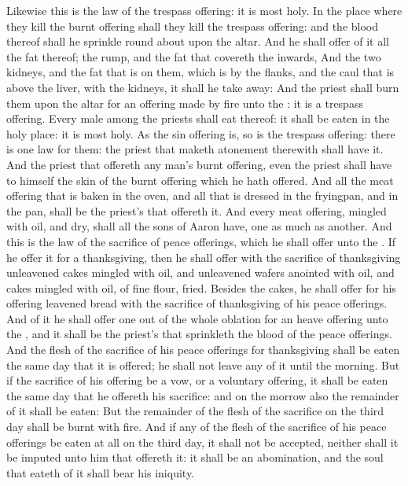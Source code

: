 \begin{biblechapter} %
 Likewise this is the law of the trespass offering: it is most holy.
\verse In the place where they kill the burnt offering shall they kill the trespass offering: and the blood thereof shall he sprinkle round about upon the altar.
\verse And he shall offer of it all the fat thereof; the rump, and the fat that covereth the inwards,
\verse And the two kidneys, and the fat that is on them, which is by the flanks, and the caul that is above the liver, with the kidneys, it shall he take away:
\verse And the priest shall burn them upon the altar for an offering made by fire unto the \LORD: it is a trespass offering.
\verse Every male among the priests shall eat thereof: it shall be eaten in the holy place: it is most holy.
\verse As the sin offering is, so is the trespass offering: there is one law for them: the priest that maketh atonement therewith shall have it.
\verse And the priest that offereth any man's burnt offering, even the priest shall have to himself the skin of the burnt offering which he hath offered.
\verse And all the meat offering that is baken in the oven, and all that is dressed in the fryingpan, and in the pan, shall be the priest's that offereth it.
\verse And every meat offering, mingled with oil, and dry, shall all the sons of Aaron have, one as much as another.
 And this is the law of the sacrifice of peace offerings, which he shall offer unto the \LORD.
\verse If he offer it for a thanksgiving, then he shall offer with the sacrifice of thanksgiving unleavened cakes mingled with oil, and unleavened wafers anointed with oil, and cakes mingled with oil, of fine flour, fried.
\verse Besides the cakes, he shall offer for his offering leavened bread with the sacrifice of thanksgiving of his peace offerings.
\verse And of it he shall offer one out of the whole oblation for an heave offering unto the \LORD, and it shall be the priest's that sprinkleth the blood of the peace offerings.
\verse And the flesh of the sacrifice of his peace offerings for thanksgiving shall be eaten the same day that it is offered; he shall not leave any of it until the morning.
\verse But if the sacrifice of his offering be a vow, or a voluntary offering, it shall be eaten the same day that he offereth his sacrifice: and on the morrow also the remainder of it shall be eaten:
\verse But the remainder of the flesh of the sacrifice on the third day shall be burnt with fire.
\verse And if any of the flesh of the sacrifice of his peace offerings be eaten at all on the third day, it shall not be accepted, neither shall it be imputed unto him that offereth it: it shall be an abomination, and the soul that eateth of it shall bear his iniquity.

\end{biblechapter}
